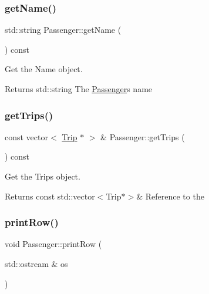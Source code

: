 \subsubsection{\texorpdfstring{get\+Name()}{getName()}}
{\footnotesize\ttfamily std\+::string Passenger\+::get\+Name (\begin{DoxyParamCaption}{ }\end{DoxyParamCaption}) const}



Get the Name object. 

\begin{DoxyReturn}{Returns}
std\+::string The \mbox{\hyperlink{classPassenger}{Passenger}}\textquotesingle{}s name 
\end{DoxyReturn}
\mbox{\label{classPassenger_a06dfa54524d4ca1a85b1599b278fb871}} 
\subsubsection{\texorpdfstring{get\+Trips()}{getTrips()}}
{\footnotesize\ttfamily const vector$<$ \mbox{\hyperlink{classTrip}{Trip}} $\ast$ $>$ \& Passenger\+::get\+Trips (\begin{DoxyParamCaption}{ }\end{DoxyParamCaption}) const}



Get the Trips object. 

\begin{DoxyReturn}{Returns}
const std\+::vector$<$\+Trip$\ast$$>$\& Reference to the 
\end{DoxyReturn}
\mbox{\label{classPassenger_a72e4042544557a3dd9c02198aa2582d8}} 
\subsubsection{\texorpdfstring{print\+Row()}{printRow()}}
{\footnotesize\ttfamily void Passenger\+::print\+Row (\begin{DoxyParamCaption}\item[{std\+::ostream \&}]{os }\end{DoxyParamCaption})}



